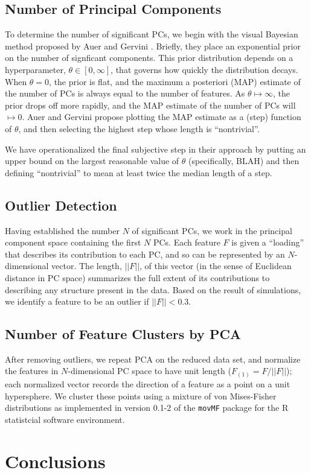 \documentclass{nature}
\begin{document}
\subsection{Number of Principal Components}
To determine the number of significant PCs, we begin with the visual
Bayesian method proposed by Auer and Gervini \cite{auer-gervini}.
Briefly, they place an exponential prior on the number of signficant
components. This prior distribution depends on a hyperparameter,
$\theta \in[0, \infty]$, that governs how quickly the distribution
decays.  When $\theta=0$, the prior is flat, and the maximum a
posteriori (MAP) estimate of the number of PCs is always equal to the
number of features.  As $\theta\mapsto\infty$, the prior drops off
more rapidly, and the MAP estimate of the number of PCs will
$\mapsto0$. Auer and Gervini propose plotting the MAP estimate as a
(step) function of $\theta$, and then selecting the highest step whose
length is ``nontrivial''.

We have operationalized the final subjective step in their approach by
putting an upper bound on the largest reasonable value of $\theta$
(specifically, BLAH) and then defining ``nontrivial'' to mean at
least twice the median length of a step.

\subsection{Outlier Detection}
Having established the number $N$ of significant PCs, we work in the
principal component space containing the first $N$ PCs.  Each feature
$F$ is given a ``loading'' that describes its contribution to each PC,
and so can be represented by an $N$-dimensional vector. The length,
$||F||$, of this vector (in the sense of Euclidean distance in PC
space) summarizes the full extent of its contributions to describing
any structure present in the data. Based on the result of simulations,
we identify a feature to be an outlier if $||F|| < 0.3$.

\subsection{Number of Feature Clusters by PCA}
After removing outliers, we repeat PCA on the reduced data set, and
normalize the features in $N$-dimensional PC space to have unit length
($F_{(1)} = F/||F||$); each normalized vector records the direction of
a feature as a point on a unit hypersphere. We cluster these points
using a mixture of von Mises-Fisher distributions
\cite{banerjee05,hornik13} as implemented in version 0.1-2 of the
\texttt{movMF} package for the R statistcial software environment.

\section{Conclusions}



{}
\end{document}
